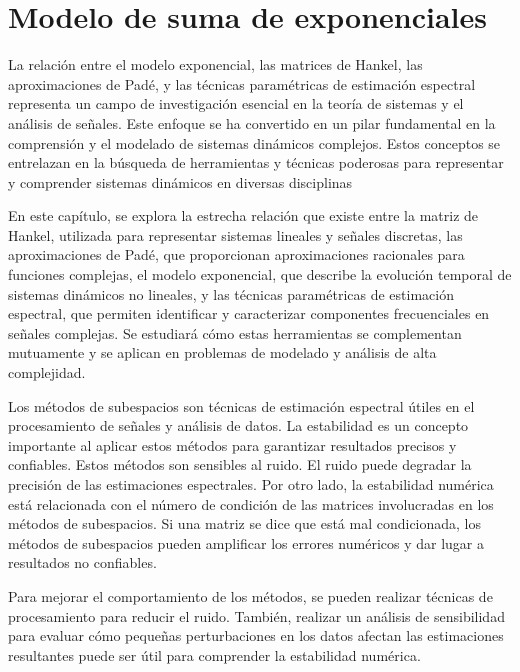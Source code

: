 

\chapter{Modelo de suma de exponenciales}\label{chap:ModeloSumExp}

La relación entre el modelo exponencial, las matrices de Hankel, las aproximaciones de Padé, y las técnicas paramétricas de estimación espectral representa un campo de investigación  esencial en la teoría de sistemas y el análisis de señales. Este enfoque se ha convertido en un pilar fundamental en la comprensión y el modelado de sistemas dinámicos complejos. Estos conceptos se entrelazan en la búsqueda de herramientas y técnicas poderosas para representar y comprender sistemas dinámicos en diversas disciplinas

En este capítulo, se explora la estrecha relación que existe entre la matriz de Hankel, utilizada para representar sistemas lineales y señales discretas, las aproximaciones de Padé, que proporcionan aproximaciones racionales para funciones complejas, el modelo exponencial, que describe la evolución temporal de sistemas dinámicos no lineales, y las técnicas paramétricas de estimación espectral, que permiten identificar y caracterizar componentes frecuenciales en señales complejas. Se estudiará cómo estas herramientas se complementan mutuamente y se aplican en problemas de modelado y análisis de alta complejidad.

Los métodos de subespacios son técnicas de estimación espectral útiles en el procesamiento de señales y análisis de datos. La estabilidad  es un concepto importante al aplicar estos métodos para garantizar resultados precisos y confiables. Estos métodos son sensibles al ruido. El ruido puede degradar la precisión de las estimaciones espectrales. Por otro lado, la estabilidad numérica está relacionada con el número de condición de las matrices involucradas en los métodos de subespacios. Si una matriz se dice que está mal condicionada, los métodos de subespacios pueden amplificar los errores numéricos y dar lugar a resultados no confiables.

Para mejorar el comportamiento de los métodos, se pueden realizar técnicas de procesamiento para reducir el ruido. También, realizar un análisis de sensibilidad para evaluar cómo pequeñas perturbaciones en los datos afectan las estimaciones resultantes puede ser útil para comprender la estabilidad numérica.


